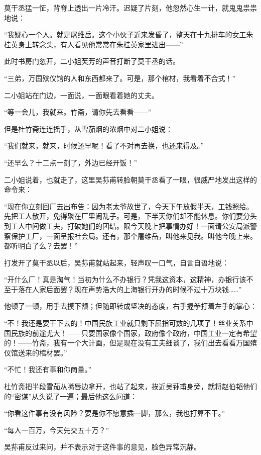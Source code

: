 \par 莫干丞猛一怔，背脊上透出一片冷汗。迟疑了片刻，他忽然心生一计，就鬼鬼祟祟地说：
\par “我疑心一个人。就是屠维岳。这个小伙子近来发昏了，整天在十九排车的女工朱桂英身上转念头，有人看见他常常在朱桂英家里进出——”
\par 此时书房门忽开，二小姐芙芳的声音打断了莫干丞的话。
\par “三弟，万国殡仪馆的人和东西都来了。可是，那个棺材，我看着不合式！”
\par 二小姐站在门边，一面说，一面眼看着她的丈夫。
\par “等一会儿，我就来。竹斋，请你先去看看——”
\par 但是杜竹斋连连摇手，从雪茄烟的浓烟中对二小姐说：
\par “我们就来，就来，时候还早呢！看了不对再去换，也还来得及。”
\par “还早么？十二点一刻了，外边已经开饭！”
\par 二小姐说着，也就走了，这里吴荪甫转脸朝莫干丞看了一眼，很威严地发出这样的命令来：
\par “现在你立刻回厂去出布告：因为老太爷故世了，今天下午放假半天，工钱照给。先把工人散开，免得聚在厂里闹乱子。可是，下半天你们却不能休息。你们要分头到工人中间做工夫，打破她们的团结。限今天晚上把事情办好！一面请公安局派警察保护工厂，一面呈报社会局。还有，那个屠维岳，叫他来见我。叫他今晚上来。都听明白了么？去罢！”
\par 打发开了莫干丞以后，吴荪甫就站起来，轻声叹一口气，自言自语地说：
\par “开什么厂！真是淘气！当初为什么不办银行？凭我这资本，这精神，办银行该不至于落在人家后面罢？现在声势浩大的上海银行开办的时候不过十万块钱……”
\par 他顿了一顿，用手去摸下颔；但随即转成坚决的态度，右手握拳打着左手的掌心：
\par “不！我还是要干下去的！中国民族工业就只剩下屈指可数的几项了！丝业关系中国民族的前途尤大！——只要国家像个国家，政府像个政府，中国工业一定有希望的！——竹斋，我有一个大计画，但是现在没有工夫细谈了，我们出去看看万国殡仪馆送来的棺材罢。”
\par “不忙！我还有事和你商量。”
\par 杜竹斋把半段雪茄从嘴唇边拿开，也站了起来，挨近吴荪甫身旁，就将赵伯韬他们的“密谋”从头说了一遍；最后他这么问道：
\par “你看这件事有没有风险？要是你不愿意插一脚，那么，我也打算不干。”
\par “每人一百万，今天先交五十万？”
\par 吴荪甫反过来问，并不表示对于这件事的意见，脸色异常沉静。
